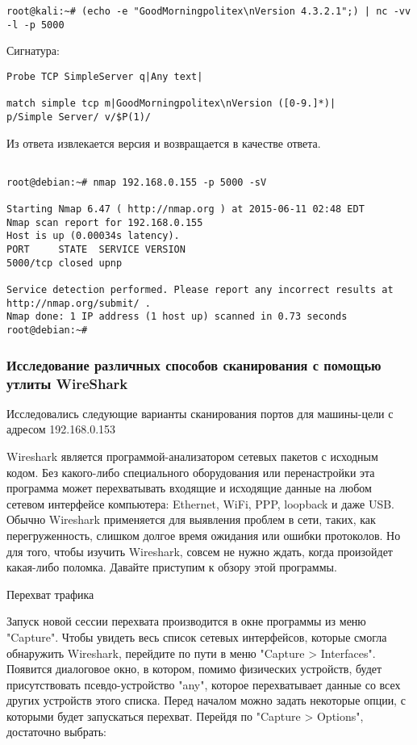 \documentclass[10pt,a4paper]{article}
\begin{document}
\begin{verbatim}
root@kali:~# (echo -e "GoodMorningpolitex\nVersion 4.3.2.1";) | nc -vv -l -p 5000
\end{verbatim}

Сигнатура: 

\begin{verbatim}
Probe TCP SimpleServer q|Any text|

match simple tcp m|GoodMorningpolitex\nVersion ([0-9.]*)|
p/Simple Server/ v/$P(1)/
\end{verbatim}

Из ответа извлекается версия и возвращается в качестве ответа.

\begin{verbatim}

root@debian:~# nmap 192.168.0.155 -p 5000 -sV

Starting Nmap 6.47 ( http://nmap.org ) at 2015-06-11 02:48 EDT
Nmap scan report for 192.168.0.155
Host is up (0.00034s latency).
PORT     STATE  SERVICE VERSION
5000/tcp closed upnp

Service detection performed. Please report any incorrect results at http://nmap.org/submit/ .
Nmap done: 1 IP address (1 host up) scanned in 0.73 seconds
root@debian:~# 

\end{verbatim}

\subsubsection{Исследование различных способов сканирования с помощью утлиты WireShark}

Исследовались следующие варианты сканирования портов для машины-цели с адресом 192.168.0.153

Wireshark является программой-анализатором сетевых пакетов с исходным кодом. Без какого-либо специального оборудования или перенастройки эта программа может перехватывать входящие и исходящие данные на любом сетевом интерфейсе компьютера: Ethernet, WiFi, PPP, loopback и даже USB. Обычно Wireshark применяется для выявления проблем в сети, таких, как перегруженность, слишком долгое время ожидания или ошибки протоколов. Но для того, чтобы изучить Wireshark, совсем не нужно ждать, когда произойдет какая-либо поломка. Давайте приступим к обзору этой программы.


Перехват трафика


Запуск новой сессии перехвата производится в окне программы из меню "Capture". Чтобы увидеть весь список сетевых интерфейсов, которые смогла обнаружить Wireshark, перейдите по пути в меню "Capture > Interfaces". Появится диалоговое окно, в котором, помимо физических устройств, будет присутствовать псевдо-устройство "any", которое перехватывает данные со всех других устройств этого списка.
Перед началом можно задать некоторые опции, с которыми будет запускаться перехват. Перейдя по "Capture > Options", достаточно выбрать:
\end{document}
